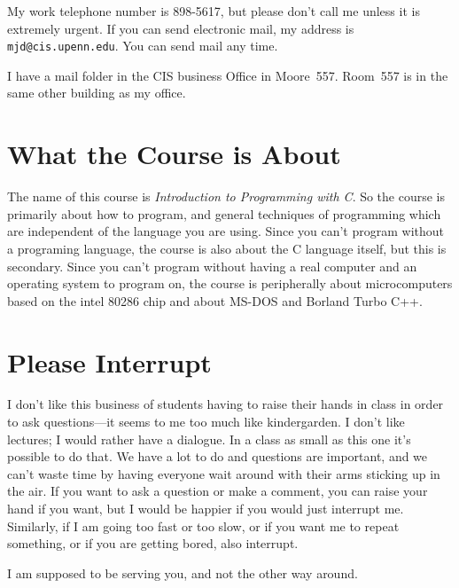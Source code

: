     My work telephone number is 898-5617, but please don't call me
unless it is extremely urgent.  If you can send electronic mail, my
address is
\verb+mjd@cis.upenn.edu+.  You can send mail any time.

    I have a mail folder in the CIS business Office in Moore~557.
Room~557 is in the same other building as my office.

\section{What the Course is About}

The name of this course is {\em Introduction to Programming with C}\/.  So
the course is primarily about how to program, and general techniques of
programming which are independent of the language you are using.  Since
you can't program without a programing language, the course is also
about the C language itself, but this is secondary.  Since you can't
program without having a real computer and an operating system to
program on, the course is peripherally about microcomputers based on the
intel 80286 chip and about MS-DOS and Borland Turbo C++.

\section{Please Interrupt}

I don't like this business of students having to raise their hands in
class in order to ask questions---it seems to me too much like
kindergarden.  I don't like lectures; I would rather have a dialogue.
In a class as small as this one it's possible to do that.  We have a lot
to do and questions are important, and we can't waste time by having
everyone wait around with their arms sticking up in the air.  If you
want to ask a question or make a comment, you can raise your hand if you
want, but I would be happier if you would just interrupt me.  Similarly,
if I am going too fast or too slow, or if you want me to repeat
something, or if you are getting bored, also interrupt.

I am supposed to be serving you, and not the other way around.




